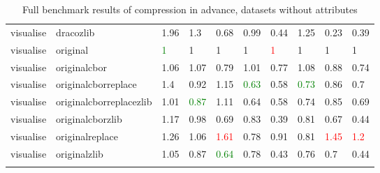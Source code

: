 \begin{landscape}
\begin{longtable}{llllllllll}
visualise & dracozlib & 1.96 & 1.3 & 0.68 & 0.99 & 0.44 & 1.25 & 0.23 & 0.39\\
visualise & original & \textcolor{green}{1} & 1 & 1 & 1 & \textcolor{red}{1} & 1 & 1 & 1\\
visualise & originalcbor & 1.06 & 1.07 & 0.79 & 1.01 & 0.77 & 1.08 & 0.88 & 0.74\\
visualise & originalcborreplace & 1.4 & 0.92 & 1.15 & \textcolor{green}{0.63} & 0.58 & \textcolor{green}{0.73} & 0.86 & 0.7\\
visualise & originalcborreplacezlib & 1.01 & \textcolor{green}{0.87} & 1.11 & 0.64 & 0.58 & 0.74 & 0.85 & 0.69\\
visualise & originalcborzlib & 1.17 & 0.98 & 0.69 & 0.83 & 0.39 & 0.81 & 0.67 & 0.44\\
visualise & originalreplace & 1.26 & 1.06 & \textcolor{red}{1.61} & 0.78 & 0.91 & 0.81 & \textcolor{red}{1.45} & \textcolor{red}{1.2}\\
visualise & originalzlib & 1.05 & 0.87 & \textcolor{green}{0.64} & 0.78 & 0.43 & 0.76 & 0.7 & 0.44\\*

\caption{Full benchmark results of compression in advance, datasets without attributes}
\label{tab:fullresultsianoattr}
\end{longtable}

\end{landscape}





